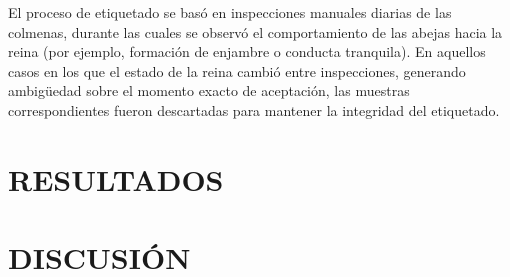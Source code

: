 \documentclass[12pt]{report}
\newenvironment{tightmulticols}{%
  \begin{multicols}{2}
  \setlength{\parskip}{0pt}
  \setlength{\parindent}{0em}
  \linespread{1}\selectfont
}{%
  \end{multicols}
}
\begin{document}
\begin{tightmulticols}
\par El proceso de etiquetado se basó en inspecciones manuales diarias de las colmenas, durante las cuales se observó el comportamiento de las abejas hacia la reina (por ejemplo, formación de enjambre o conducta tranquila). En aquellos casos en los que el estado de la reina cambió entre inspecciones, generando ambigüedad sobre el momento exacto de aceptación, las muestras correspondientes fueron descartadas para mantener la integridad del etiquetado.

\end{tightmulticols}


\pagebreak
\chapter{RESULTADOS}
\vspace{-3em}




\pagebreak
\chapter{DISCUSIÓN}
\vspace{-3em}


\end{document}
